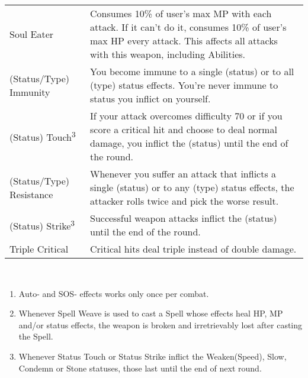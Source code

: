 \begin{table}[ht]
\begin{tabular}{p{}p{}}
        Soul Eater & Consumes 10\% of user’s max MP with each attack. If it can’t do it, consumes 10\% of user’s max HP every attack. This affects all attacks with this weapon, including Abilities. \\
        (Status/Type) Immunity & You become immune to a single (status) or to all (type) status effects. You're never immune to status you inflict on yourself. \\
        (Status) Touch\textsuperscript{3} & If your attack overcomes difficulty 70 or if you score a critical hit and choose to deal normal damage, you inflict the (status) until the end of the round. \\
        (Status/Type) Resistance & Whenever you suffer an attack that inflicts a single (status) or to any (type) status effects, the attacker rolls twice and pick the worse result. \\
        (Status) Strike\textsuperscript{3} & Successful weapon attacks inflict the (status) until the end of the round. \\
        Triple Critical & Critical hits deal triple instead of double damage. \\ \bottomrule
        \end{tabular} \\
\end{table}
\begin{footnotesize}
\begin{enumerate}
    \item Auto- and SOS- effects works only once per combat.
    \item Whenever Spell Weave is used to cast a Spell whose effects heal HP, MP and/or status effects, the weapon is broken and irretrievably lost after casting the Spell.
    \item Whenever Status Touch or Status Strike inflict the Weaken(Speed), Slow, Condemn or Stone statuses, those last until the end of next round.
\end{enumerate}
\end{footnotesize}